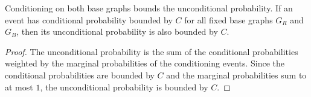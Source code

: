 \begin{helper}[FiberAndDegreeMixedLiftedIntersectionConditioning]
\label{helper:FiberAndDegreeMixedLiftedIntersectionConditioning}
Conditioning on both base graphs bounds the unconditional probability.
If an event has conditional probability bounded by $C$ for all fixed base graphs $G_R$ and $G_B$, then its unconditional probability is also bounded by $C$.
\end{helper}

\begin{proof}
The unconditional probability is the sum of the conditional probabilities weighted by the marginal probabilities of the conditioning events. Since the conditional probabilities are bounded by $C$ and the marginal probabilities sum to at most $1$, the unconditional probability is bounded by $C$.
\end{proof}
